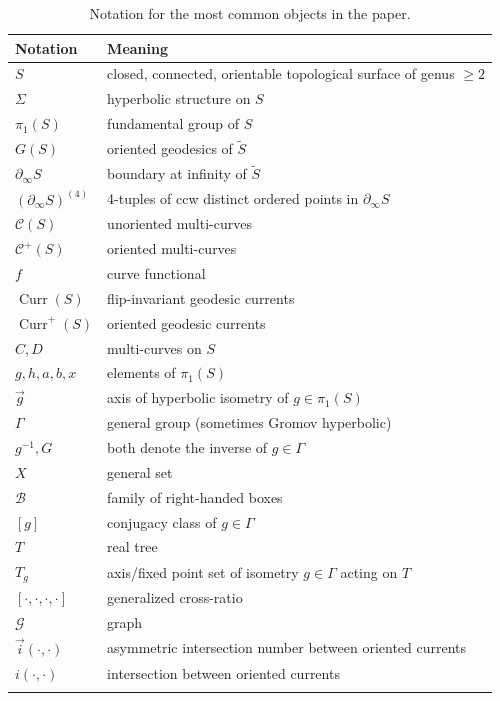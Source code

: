 \documentclass[11pt]{amsart}
\newcommand{\ora}[1]{\overrightarrow{#1}}
\numberwithin{equation}{section}
\numberwithin{figure}{section}
\theoremstyle{definition}
\theoremstyle{plain}
\DeclareMathOperator{\Curr}{Curr}
\newcommand*{\wt}[1]{\widetilde{#1}}
\newcommand{\Curves}{\mathcal{C}}
\begin{document}
\begin{table}[ht!]
    \begin{tabular}{@{}ll@{}}
      \toprule
      Notation & Meaning \\
      \midrule
         $S$ &  closed, connected, orientable topological surface of genus $\geq 2$ \\
         $\Sigma$ &  hyperbolic structure on $S$ \\
         $\pi_1(S)$
         &  fundamental group of $S$ \\
         $G(S)$
         &  oriented geodesics of $\wt{S}$ \\   $\partial_{\infty}S$ &  boundary at infinity of $\wt{S}$ \\        
        $(\partial _\infty S)^{(4)}$ & 4-tuples of ccw distinct ordered points in $\partial_\infty S$ \\
         $\Curves(S)$ & unoriented multi-curves \\
         $\Curves^+(S)$ & oriented multi-curves \\
         $f$ & curve functional \\
         $\Curr(S)$ & flip-invariant geodesic currents \\
         $\Curr^+(S)$ & oriented geodesic currents \\
         $C,D$ & multi-curves on $S$\\
         $g,h,a,b,x$ & elements of $\pi_1(S)$ \\ 
                  $\ora{g}$ & axis of hyperbolic isometry of $g \in \pi_1(S)$ \\  
$\Gamma$
         & general group (sometimes Gromov hyperbolic) \\
         $g^{-1}, G$ & both denote the inverse of $g \in \Gamma$ \\ 
        $X$ & general set \\
 $\mathcal{B}$ & family of right-handed boxes \\ 
         $[g]$ & conjugacy class of $g \in \Gamma$ \\  
         $T$ & real tree \\ 
         $T_g$ & axis/fixed point set of isometry $g \in \Gamma$ acting on $T$ \\ 
        $[\cdot,\cdot,\cdot, \cdot ]$ & generalized cross-ratio \\
        $\mathcal{G}$ & graph\\ 
        $\vec{i}(\cdot, \cdot)$ & asymmetric intersection number between oriented currents \\
        $i(\cdot, \cdot)$ & intersection between oriented currents \\ \bottomrule\addlinespace
    \end{tabular}
  \caption{Notation for the most common objects in the paper.}\label{tab:object-notation}
\end{table} 
\end{document}
